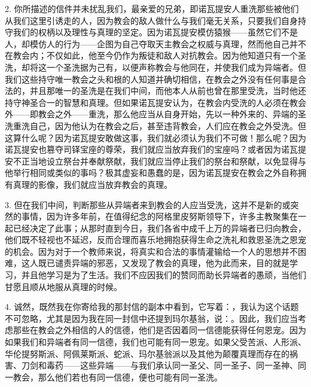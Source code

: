 2. 你所描述的信件并未扰乱我们，最亲爱的兄弟，即诺瓦提安人重洗那些被他们从我们这里引诱走的人，因为教会的敌人做什么与我们毫无关系，只要我们自身持守我们的权柄以及理性与真理的坚定。因为诺瓦提安模仿猿猴——虽然它们不是人，却模仿人的行为——企图为自己夺取天主教会之权威与真理，然而他自己并不在教会内；不仅如此，他至今仍作为叛徒和敌人对抗教会。因为他知道只有一个圣洗，却将这一个圣洗据为己有，以便声称教会与他同在，并使我们成为异端者。但我们这些持守唯一教会之头和根的人知道并确切相信，在教会之外没有任何事是合法的，并且那唯一的圣洗是在我们中间，而他本人从前也曾在那里受洗，当时他还持守神圣合一的智慧和真理。但如果诺瓦提安认为，在教会内受洗的人必须在教会外——即教会之外——重洗，那么他应当从自身开始，先以一种外来的、异端的圣洗重洗自己，因为他认为在教会之后，甚至违背教会，人们应在教会之外受洗。但这算什么呢？因为诺瓦提安敢做这事，我们就必须认为我们不可做！那么呢？因为诺瓦提安也篡夺司铎宝座的尊荣，我们就应当放弃我们的宝座吗？或者因为诺瓦提安不正当地设立祭台并奉献祭献，我们就应当停止我们的祭台和祭献，以免显得与他举行相同或类似的事吗？极其虚妄和愚蠢的是，因为诺瓦提安在教会之外自称拥有真理的影像，我们就应当放弃教会的真理。\par

3. 但在我们中间，判断那些从异端者来到教会的人应当受洗，这并不是新的或突然的事情，因为许多年前，在值得纪念的阿格里皮努斯领导下，许多主教聚集在一起已经决定了此事；从那时直到今日，我们各省中成千上万的异端者已归向教会，他们既不轻视也不延迟，反而合理而喜乐地拥抱获得生命之洗礼和救恩圣洗之恩宠的机会。因为对于一个教师来说，将真实和合法的事情灌输给一个人的思想并不困难，这人既已谴责异端的邪恶，又发现了教会的真理，他为此而来，目的就是学习，并且他学习是为了生活。我们不应因我们的赞同而助长异端者的愚顽，当他们甘愿且顺从地服从真理的时候。\par

4. 诚然，既然我在你寄给我的那封信的副本中看到，它写着：，我认为这个话题不可忽略，尤其是因为我在同一封信中还提到玛尔基翁，说：。因此，我们应当考虑那些在教会之外相信的人的信德，他们是否因着同一信德能获得任何恩宠。因为如果我们和异端者有同一信德，我们也可能有同一恩宠。如果父受苦派、人形派、华伦提努斯派、阿佩莱斯派、蛇派、玛尔基翁派以及其他为颠覆真理而存在的祸害、刀剑和毒药——这些异端——与我们承认同一圣父、同一圣子、同一圣神、同一教会，那么他们若也有同一信德，便也可能有同一圣洗。\par

